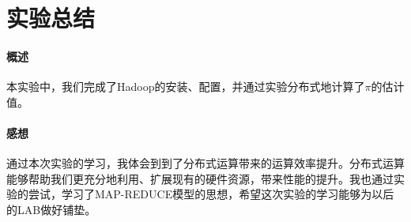 \documentclass{article}
\begin{document}
\section{实验总结}
\paragraph{概述}
本实验中，我们完成了Hadoop的安装、配置，并通过实验分布式地计算了$\pi$的估计值。

\paragraph{感想}
通过本次实验的学习，我体会到到了分布式运算带来的运算效率提升。分布式运算能够帮助我们更充分地利用、扩展现有的硬件资源，带来性能的提升。我也通过实验的尝试，学习了MAP-REDUCE模型的思想，希望这次实验的学习能够为以后的LAB做好铺垫。
\end{document}
